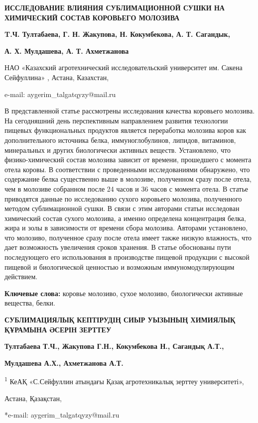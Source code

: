 {\bfseries ИССЛЕДОВАНИЕ ВЛИЯНИЯ СУБЛИМАЦИОННОЙ СУШКИ НА ХИМИЧЕСКИЙ СОСТАВ
КОРОВЬЕГО МОЛОЗИВА}

{\bfseries T.Ч. Тултабаева, Г. Н. Жакупова, Н. Кокумбекова, А. Т.
Сагандык,}

{\bfseries А. Х. Мулдашева, А. Т. Ахметжанова}

НАО «Казахский агротехнический исследовательский университет им. Сакена
Сейфуллина» , Астана, Казахстан,

e-mail: aygerim\_talgatqyzy@mail.ru

В представленной статье рассмотрены исследования качества коровьего
молозива. На сегодняшний день перспективным направлением развития
технологии пищевых функциональных продуктов является переработка
молозива коров как дополнительного источника белка, иммуноглобулинов,
липидов, витаминов, минеральных и других биологически активных веществ.
Установлено, что физико-химический состав молозива зависит от времени,
прошедшего с момента отела коровы. В соответствии с проведенными
исследованиями обнаружено, что содержание белка существенно выше в
молозиве, полученном сразу после отела, чем в молозиве собранном после
24 часов и 36 часов с момента отела. В статье приводятся данные по
исследованию сухого коровьего молозива, полученного методом
сублимационной сушки. В связи с этим авторами статьи исследован
химический состав сухого молозива, а именно определена концентрация
белка, жира и золы в зависимости от времени сбора молозива. Авторами
установлено, что молозиво, полученное сразу после отела имеет также
низкую влажность, что дает возможность увеличения сроков хранения. В
статье обоснованы пути последующего его использования в производстве
пищевой продукции с высокой пищевой и биологической ценностью и
возможным иммуномодулирующим действием.

{\bfseries Ключевые слова:} коровье молозиво, сухое молозиво, биологически
активные вещества, белки.

{\bfseries СУБЛИМАЦИЯЛЫҚ КЕПТІРУДІҢ СИЫР УЫЗЫНЫҢ ХИМИЯЛЫҚ ҚҰРАМЫНА ӘСЕРІН
ЗЕРТТЕУ}

{\bfseries Тултабаева Т.Ч., Жакупова Г.Н., Кокумбекова Н., Сағандық А.Т.,}

{\bfseries Мулдашева А.Х., Ахметжанова А.Т.}

\textsuperscript{1} КеАҚ «С.Сейфуллин атындағы Қазақ агротехникалық
зерттеу университеті»,

Астана, Қазақстан,

*e-mail: aygerim\_talgatqyzy@mail.ru

